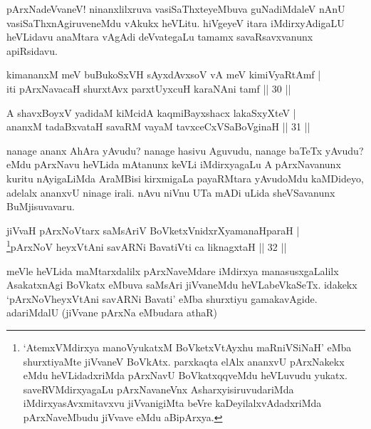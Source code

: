\begin{artha}
pArxNadeVvaneV! ninanxlilxruva vasiSaThxteyeMbuva guNadiMdaleV nAnU 
vasiSaThxnAgiruveneMdu vAkukx heVLitu. hiVgeyeV itara iMdirxyAdigaLU 
heVLidavu anaMtara vAgAdi deVvategaLu tamamx savaRsavxvanunx apiRsidavu.
\end{artha}


\begin{shl}
kimananxM meV buBukoSxVH sAyxdAvxsoV vA meV kimiVyaRtAmf | \\
iti pArxNavacaH shurxtAvx parxtUyxcuH karaNAni tamf \hfill|| 30 || 
\end{shl}

\begin{shl}
A shavxBoyxV yadidaM kiMcidA kaqmiBayxshacx lakaSxyXteV | \\
ananxM tadaBxvataH savaRM vayaM tavxceCxVSaBoVginaH \hfill|| 31 || 
\end{shl}

\begin{artha}
nanage ananx AhAra yAvudu? nanage hasivu Aguvudu, nanage baTeTx 
yAvudu? eMdu pArxNavu heVLida mAtanunx keVLi iMdirxyagaLu A 
pArxNavanunx kuritu nAyigaLiMda AraMBisi kirxmigaLa payaRMtara 
yAvudoMdu kaMDideyo, adelalx ananxvU ninage irali. nAvu niVnu UTa mADi 
uLida sheVSavanunx BuMjisuvavaru.
\end{artha}


\begin{shl}
jiVvaH pArxNoV\s tarx saMsAriV BoVketxVnidxrXyamanaHparaH | \\
\footnote{`AtemxVMdirxya manoVyukatxM BoVketxVtAyxhu maRniVSiNaH' eMba shurxtiyaMte jiVvaneV BoVkAtx. parxkaqta elAlx ananxvU pArxNakekx eMdu heVLidadxriMda pArxNavU BoVkatxqqveMdu heVLuvudu yukatx. saveRVMdirxyagaLu pArxNavaneVnx AsharxyisiruvudariMda iMdirxyasAvxmitavxvu jiVvanigiMta beVre kaDeyilalxvAdadxriMda pArxNaveMbudu jiVvave eMdu aBipArxya.}pArxNoV heyxVtAni savARNi BavatiVti ca liknagxtaH \hfill|| 32 || 
\end{shl}

\begin{artha}
meVle heVLida maMtarxdalilx pArxNaveMdare iMdirxya manasusxgaLalilx AsakatxnAgi BoVkatx eMbuva saMsAri jiVvaneMdu heVLabeVkaSeTx. idakekx `pArxNoVheyxVtAni savARNi Bavati' eMba shurxtiyu gamakavAgide. adariMdalU (jiVvane pArxNa eMbudara athaR)
\end{artha}

